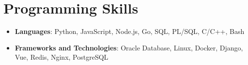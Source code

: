 \documentclass[10pt, letterpaper]{article}
\newenvironment{highlights}{
    \begin{itemize}[
        topsep=0.10 cm,
        parsep=0.10 cm,
        partopsep=0pt,
        itemsep=0pt,
        leftmargin=0.4 cm + 10pt
    ]
}{
    \end{itemize}
} %
\begin{document}
    \section{Programming Skills}
    \begin{highlights}
    \item \textbf{Languages}: Python, JavaScript, Node.js, Go, SQL, PL/SQL, C/C++, Bash
    \item \textbf{Frameworks and Technologies}: Oracle Database, Linux, Docker, Django, Vue, Redis, Nginx, PostgreSQL
    \end{highlights}

\end{document}
